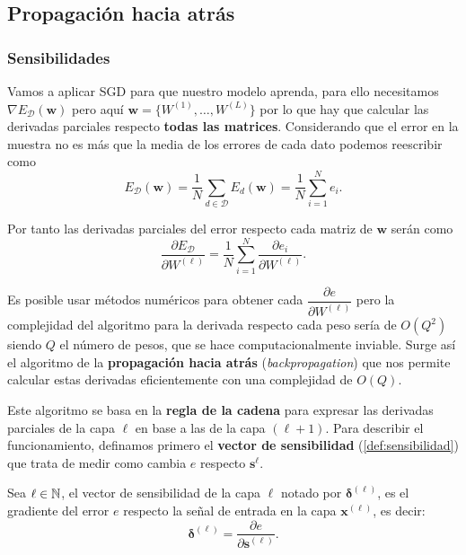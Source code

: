 \subsection{Propagación hacia atrás}

\subsubsection{Sensibilidades}

Vamos a aplicar SGD para que nuestro modelo aprenda, para ello necesitamos $\nabla E_{\mathcal{D}} (\textbf{w})$ pero aquí $\textbf{w} = \{W^{(1)}, \ldots, W^{(L)}\}$ por lo que hay que calcular las derivadas parciales respecto \textbf{todas las matrices}. Considerando que el error en la muestra no es más que la media de los errores de cada dato podemos reescribir como
\begin{equation*}
  E_{\mathcal{D}}(\textbf{w}) = \dfrac{1}{N} \sum \limits_{d \in \mathcal{D}} E_d(\textbf{w}) = \dfrac{1}{N} \sum \limits^N_{i = 1} e_i.
  \label{eq:esample}
\end{equation*}

Por tanto las derivadas parciales del error respecto cada matriz de $\textbf{w}$ serán como
\begin{equation*}
  \dfrac{\partial E_{\mathcal{D}}}{\partial W^{(\ell)}} = \dfrac{1}{N} \sum \limits^N_{i = 1} \dfrac{\partial e_i}{\partial W^{(\ell)}}.
  \label{eq:ederiv}
\end{equation*}

Es posible usar métodos numéricos para obtener cada $\dfrac{\partial e}{\partial W^{(\ell)}}$ pero la complejidad del algoritmo para la derivada respecto cada peso sería de $O(Q^2)$ siendo $Q$ el número de pesos, que se hace computacionalmente inviable. Surge así el algoritmo de la \textbf{propagación hacia atrás} (\emph{backpropagation}) que nos permite calcular estas derivadas eficientemente con una complejidad de $O(Q)$.

Este algoritmo se basa en la \textbf{regla de la cadena} para expresar las derivadas parciales de la capa $\ell$ en base a las de la capa $(\ell + 1)$. Para describir el funcionamiento, definamos primero el \textbf{vector de sensibilidad} (\autoref{def:sensibilidad}) que trata de medir como cambia $e$ respecto $\textbf{s}^{\ell}$.

\begin{definicion}
  Sea $\ell \in \mathbb{N}$, el vector de sensibilidad de la capa $\ell$ notado por $\pmb{\delta}^{(\ell)}$, es el gradiente del error $e$ respecto la señal de entrada en la capa $\textbf{x}^{(\ell)}$, es decir:
  $$\pmb{\delta}^{(\ell)} = \dfrac{\partial e}{\partial \textbf{s}^{(\ell)}}.$$
  \label{def:sensibilidad}
\end{definicion}

